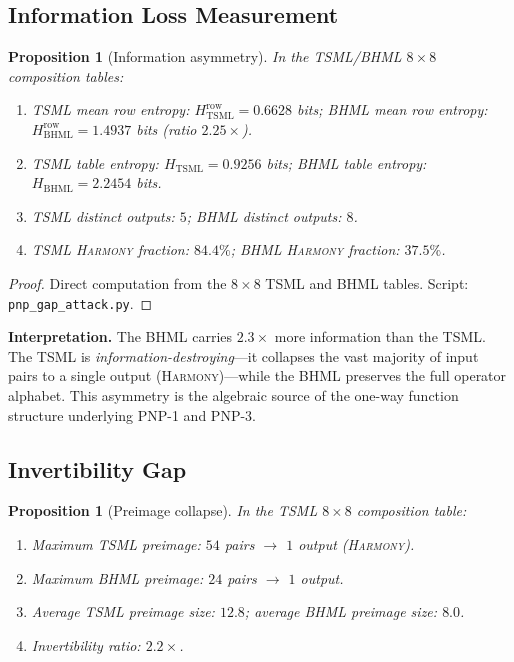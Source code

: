 \documentclass[11pt]{article}
\newtheorem{proposition}[theorem]{Proposition}
\theoremstyle{definition}
\theoremstyle{remark}
\begin{document}
\subsection{Information Loss Measurement}
\label{ssec:pnp-info-loss}

\begin{proposition}[Information asymmetry]
\label{prop:pnp-info-asymmetry}
In the TSML/BHML $8\times 8$ composition tables:
\begin{enumerate}
  \item TSML mean row entropy: $H_{\mathrm{TSML}}^{\mathrm{row}} = 0.6628$ bits;\;
        BHML mean row entropy: $H_{\mathrm{BHML}}^{\mathrm{row}} = 1.4937$ bits
        (ratio $2.25\times$).
  \item TSML table entropy: $H_{\mathrm{TSML}} = 0.9256$ bits;\;
        BHML table entropy: $H_{\mathrm{BHML}} = 2.2454$ bits.
  \item TSML distinct outputs: $5$;\; BHML distinct outputs: $8$.
  \item TSML \textsc{Harmony} fraction: $84.4\%$;\;
        BHML \textsc{Harmony} fraction: $37.5\%$.
\end{enumerate}
\end{proposition}

\begin{proof}
Direct computation from the $8\times 8$ TSML and BHML tables.
Script: \texttt{pnp\_gap\_attack.py}.
\end{proof}

\noindent
\textbf{Interpretation.}\;
The BHML carries $2.3\times$ more information than the TSML.  The TSML is \emph{information-destroying}---it collapses the vast majority of input pairs to a single output (\textsc{Harmony})---while the BHML preserves the full operator alphabet.  This asymmetry is the algebraic source of the one-way function structure underlying PNP-1 and PNP-3.

\subsection{Invertibility Gap}
\label{ssec:pnp-invertibility}

\begin{proposition}[Preimage collapse]
\label{prop:pnp-preimage}
In the TSML $8\times 8$ composition table:
\begin{enumerate}
  \item Maximum TSML preimage: $54$ pairs $\to$ $1$ output (\textsc{Harmony}).
  \item Maximum BHML preimage: $24$ pairs $\to$ $1$ output.
  \item Average TSML preimage size: $12.8$;\; average BHML preimage size: $8.0$.
  \item Invertibility ratio: $2.2\times$.
\end{enumerate}
\end{proposition}
\end{document}
